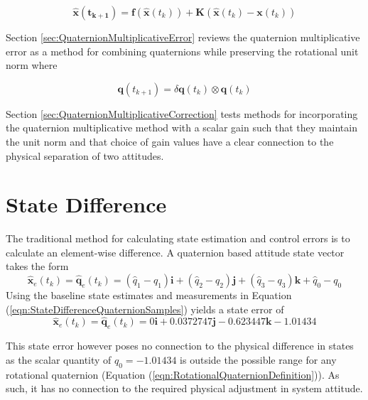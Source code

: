 \documentclass[]{aiaa-tc}%
\newcommand{\bs}[1]{\boldsymbol{#1}}
\begin{document}
\begin{equation}
  \bs{\hat{x}(t_{k+1})} = \bs{f}(\bs{\hat{x}}(t_{k})) + \bs{K} ( \bs{\hat{x}}(t_{k}) - \bs{x}(t_{k}) )
  \label{eqn:PEstimatorStateDiff}
\end{equation}

Section \ref{sec:QuaternionMultiplicativeError} reviews the quaternion multiplicative error as a method for combining quaternions while preserving the rotational unit norm where

\begin{equation}
  \bs{q}(t_{k+1}) = \delta \bs{q}(t_{k}) \otimes \bs{q}(t_{k})
\end{equation}

Section \ref{sec:QuaternionMultiplicativeCorrection} tests methods for incorporating the quaternion multiplicative method with a scalar gain such that they maintain the unit norm and that choice of gain values have a clear connection to the physical separation of two attitudes.

\section{State Difference}
\label{sec:StateDifference}

The traditional method for calculating state estimation and control errors is to calculate an element-wise difference.  A quaternion based attitude state vector takes the form
\begin{equation}
  \bs{\hat{x}}_e(t_{k}) = \bs{\hat{q}}_e(t_{k}) = (\hat{q}_1 - q_{1}) \bs{i} + (\hat{q}_2 - q_{2}) \bs{j} + (\hat{q}_3 - q_{3}) \bs{k} + \hat{q}_0 - q_{0}
  \label{eqn:StateDifference}
\end{equation}
Using the baseline state estimates and measurements in Equation (\ref{eqn:StateDifferenceQuaternionSamples}) yields a state error of
\begin{equation}
  \bs{\hat{x}}_e(t_{k}) = \bs{\hat{q}}_e(t_{k}) = 0 \bs{i} +0.0372747 \bs{j} -0.623447 \bs{k} -1.01434
  \label{eqn:StateDifferenceSample}
\end{equation}

This state error however poses no connection to the physical difference in states as the scalar quantity of $q_0 = -1.01434$ is outside the possible range for any rotational quaternion (Equation (\ref{eqn:RotationalQuaternionDefinition})).  As such, it has no connection to the required physical adjustment in system attitude.
\end{document}

